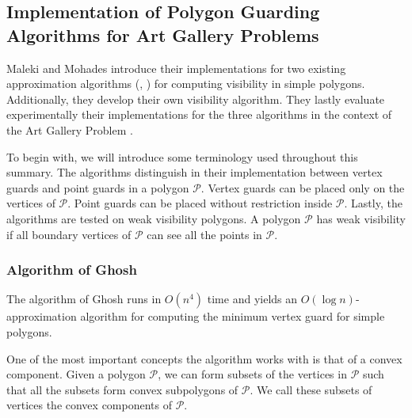 \subsection[Implementation of Guarding Algorithms \cite{maleki2022implementation}]{Implementation of Polygon Guarding Algorithms for Art Gallery Problems \cite{maleki2022implementation}}
Maleki and Mohades \cite{maleki2022implementation} introduce their implementations for two existing approximation algorithms (\cite{GHOSH2010718}, \cite{bhattacharya2016approximability}) for computing visibility in simple polygons. Additionally, they develop their own visibility algorithm. They lastly  evaluate experimentally their implementations for the three algorithms in the context of the Art Gallery Problem \cite{o1987art}.

To begin with, we will introduce some terminology used throughout this summary. The algorithms distinguish in their implementation between vertex guards and point guards in  a polygon $\mathcal P$. Vertex guards can be placed only on the vertices of $\mathcal P$. Point guards can be placed without restriction inside $\mathcal P$. Lastly, the algorithms are tested on weak visibility polygons. A polygon $\mathcal P$ has weak visibility if all boundary vertices of $\mathcal P$ can see all the points in $\mathcal P$.


\subsubsection{Algorithm of Ghosh \cite{GHOSH2010718}}
The algorithm of Ghosh \cite{GHOSH2010718} runs in $O(n^4)$ time and yields an $O(\log n)$-approximation algorithm for computing the minimum vertex guard for simple polygons. 

One of the most important concepts the algorithm works with is that of a convex component. Given a polygon $\mathcal P$, we can form subsets of the vertices in $\mathcal P$ such that all the subsets form convex subpolygons of $\mathcal P$. We call these subsets of vertices the convex components of $\mathcal P$.

